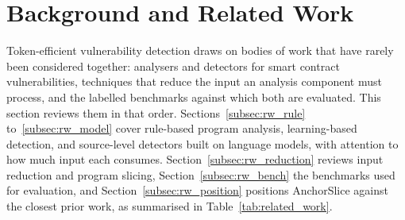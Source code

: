 \documentclass{ieeeaccess}
\begin{document}
\section{Background and Related Work}\label{sec:related}
Token-efficient vulnerability detection draws on bodies of work that have rarely been considered together: analysers and detectors for smart contract vulnerabilities, techniques that reduce the input an analysis component must process, and the labelled benchmarks against which both are evaluated. This section reviews them in that order. Sections~\ref{subsec:rw_rule} to~\ref{subsec:rw_model} cover rule-based program analysis, learning-based detection, and source-level detectors built on language models, with attention to how much input each consumes. Section~\ref{subsec:rw_reduction} reviews input reduction and program slicing, Section~\ref{subsec:rw_bench} the benchmarks used for evaluation, and Section~\ref{subsec:rw_position} positions AnchorSlice against the closest prior work, as summarised in Table~\ref{tab:related_work}.
\end{document}
